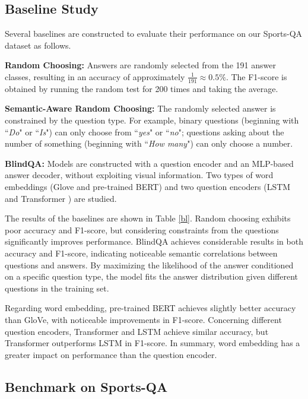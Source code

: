 \subsection{Baseline Study}

Several baselines are constructed to evaluate their performance on our Sports-QA dataset as follows.

\noindent\textbf{Random Choosing:} Answers are randomly selected from the 191 answer classes, resulting in an accuracy of approximately $\frac{1}{191} \approx 0.5\%$. The F1-score is obtained by running the random test for 200 times and taking the average.

\noindent\textbf{Semantic-Aware Random Choosing:} The randomly selected answer is constrained by the question type. For example, binary questions (beginning with ``\textit{Do}" or ``\textit{Is}") can only choose from ``\textit{yes}" or ``\textit{no}"; questions asking about the number of something (beginning with ``\textit{How many}") can only choose a number.

\noindent\textbf{BlindQA:} Models are constructed with a question encoder and an MLP-based answer decoder, without exploiting visual information. Two types of word embeddings (Glove and pre-trained BERT) and two question encoders (LSTM and Transformer \citep{vaswani2017attention}) are studied.

The results of the baselines are shown in Table \ref{bl}. Random choosing exhibits poor accuracy and F1-score, but considering constraints from the questions significantly improves performance. BlindQA achieves considerable results in both accuracy and F1-score, indicating noticeable semantic correlations between questions and answers. By maximizing the likelihood of the answer conditioned on a specific question type, the model fits the answer distribution given different questions in the training set.

Regarding word embedding, pre-trained BERT achieves slightly better accuracy than GloVe, with noticeable improvements in F1-score. Concerning different question encoders, Transformer and LSTM achieve similar accuracy, but Transformer outperforms LSTM in F1-score. In summary, word embedding has a greater impact on performance than the question encoder.

\subsection{Benchmark on Sports-QA}

